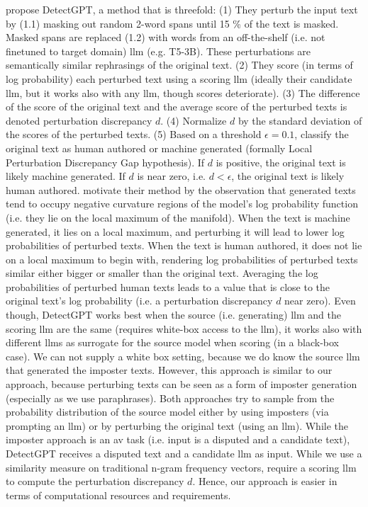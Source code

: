 \citet{mitchell_detectgpt_2023} propose DetectGPT, a method that is threefold:
(1) They perturb the input text by (1.1) masking out random 2-word spans until 15 \% of the text is masked. 
Masked spans are replaced (1.2) with words from an off-the-shelf (i.e. not finetuned to target domain) \ac{llm} (e.g. T5-3B). 
These perturbations are semantically similar rephrasings of the original text.
(2) They score (in terms of log probability) each perturbed text using a scoring \ac{llm} 
(ideally their candidate \ac{llm}, but it works also with any \ac{llm}, though scores deteriorate). 
(3) The difference of the score of the original text and the average score of the perturbed texts is denoted perturbation discrepancy $d$. 
(4) Normalize $d$ by the standard deviation of the scores of the perturbed texts.
(5) Based on a threshold $\epsilon=0.1$, classify the original text as human authored or machine generated 
(formally Local Perturbation Discrepancy Gap hypothesis).
If $d$ is positive, the original text is likely machine generated.
If $d$ is near zero, i.e. $d < \epsilon$, the original text is likely human authored.
\citet{mitchell_detectgpt_2023} motivate their method by the observation that generated texts tend to occupy 
negative curvature regions of the model's log probability function (i.e. they lie on the local maximum of the manifold).
When the text is machine generated, it lies on a local maximum, 
and perturbing it will lead to lower log probabilities of perturbed texts.
When the text is human authored, it does not lie on a local maximum to begin with, 
rendering log probabilities of perturbed texts similar either bigger or smaller than the original text.
Averaging the log probabilities of perturbed human texts leads to a value that is 
close to the original text's log probability (i.e. a perturbation discrepancy $d$ near zero).
Even though, DetectGPT works best when the source (i.e. generating) \ac{llm} and the scoring \ac{llm} are the same 
(requires white-box access to the \ac{llm}), 
it works also with different \acp{llm} as surrogate for the source model when scoring (in a black-box case).
We can not supply a white box setting, because we do know the source \ac{llm} that generated the imposter texts.
However, this approach is similar to our approach, because perturbing texts can be seen as a 
form of imposter generation (especially as we use paraphrases). 
Both approaches try to sample from the probability distribution of the source model either 
by using imposters (via prompting an \ac{llm}) or by perturbing the original text (using an \ac{llm}).
While the imposter approach is an \ac{av} task (i.e. input is a disputed and a candidate text), 
DetectGPT receives a disputed text and a candidate \ac{llm} as input.
While we use a similarity measure on traditional n-gram frequency vectors, 
\citet{mitchell_detectgpt_2023} require a scoring \ac{llm} to compute the perturbation discrepancy $d$.
Hence, our approach is easier in terms of computational resources and requirements.

